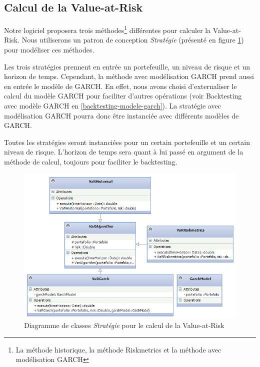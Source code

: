 \documentclass[a4paper]{report}
\begin{document}
\subsection{Calcul de la Value-at-Risk}

Notre logiciel proposera trois méthodes\footnote{La méthode historique, la méthode Riskmetrics et la méthode avec modélisation GARCH} différentes pour calculer la Value-at-Risk.
Nous utiliserons un patron de conception \textit{Stratégie} (présenté en figure \ref{fig:diagramme-classes-var-strategy}) pour modéliser ces méthodes.

Les trois stratégies prennent en entrée un portefeuille, un niveau de risque et un horizon de temps.
Cependant, la méthode avec modélisation GARCH prend aussi en entrée le modèle de GARCH.
En effet, nous avons choisi d'externaliser le calcul du modèle GARCH pour faciliter d'autres opérations (voir Backtesting avec modèle GARCH en \ref{backtesting-modele-garch}).
La stratégie avec modélisation GARCH pourra donc être instanciée avec différents modèles de GARCH.

Toutes les stratégies seront instanciées pour un certain portefeuille et un certain niveau de risque.
L'horizon de temps sera quant à lui passé en argument de la méthode de calcul, toujours pour faciliter le backtesting.

\begin{figure}
  	\center
  	\includegraphics[width=1\textwidth]{diagramme-classes-var-strategy.png}
  	\caption{Diagramme de classes \textit{Stratégie} pour le calcul de la Value-at-Risk}
  	\label{fig:diagramme-classes-var-strategy}
\end{figure}
\end{document}
